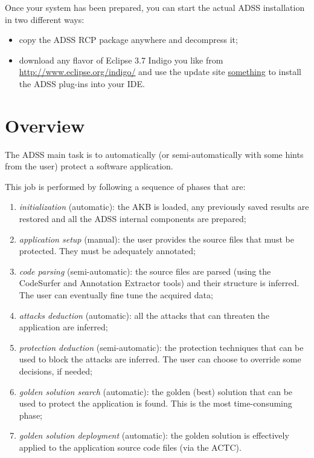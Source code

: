 \documentclass{memoir}
\begin{document}
	Once your system has been prepared, you can start the actual ADSS installation in two different ways:
	
	\begin{itemize}
		\item copy the ADSS RCP package anywhere and decompress it;
		\item download any flavor of Eclipse 3.7 Indigo you like from \url{http://www.eclipse.org/indigo/} and use the update site \url{something} to install the ADSS plug-ins into your IDE.
	\end{itemize}
	
	\chapter{Overview}
	
	The ADSS main task is to automatically (or semi-automatically with some hints from the user) protect a software application.
	
	This job is performed by following a sequence of phases that are:
	
	\begin{enumerate}
		\item \emph{initialization} (automatic): the AKB is loaded, any previously saved results are restored and all the ADSS internal components are prepared;
		\item \emph{application setup} (manual): the user provides the source files that must be protected. They must be adequately annotated;
		\item \emph{code parsing} (semi-automatic): the source files are parsed (using the CodeSurfer and Annotation Extractor tools) and their structure is inferred. The user can eventually fine tune the acquired data;
		\item \emph{attacks deduction} (automatic): all the attacks that can threaten the application are inferred;
		\item \emph{protection deduction} (semi-automatic): the protection techniques that can be used to block the attacks are inferred. The user can choose to override some decisions, if needed;
		\item \emph{golden solution search} (automatic): the golden (best) solution that can be used to protect the application is found. This is the most time-consuming phase;
		\item \emph{golden solution deployment} (automatic): the golden solution is effectively applied to the application source code files (via the ACTC).
	\end{enumerate}
	
\end{document}
